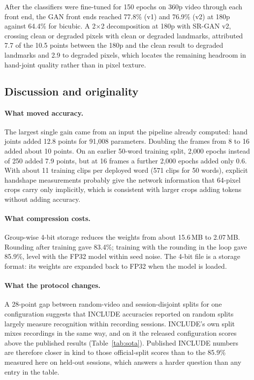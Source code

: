 \documentclass[pdflatex,sn-mathphys-num,twocolumn,lineno]{sn-jnl}
\theoremstyle{thmstyleone}%
\begin{document}
After the classifiers were fine-tuned for 150 epochs on 360p video through each front end, the GAN front ends reached 77.8\% (v1) and 76.9\% (v2) at 180p against 64.4\% for bicubic. A 2$\times$2 decomposition at 180p with SR-GAN v2, crossing clean or degraded pixels with clean or degraded landmarks, attributed 7.7 of the 10.5 points between the 180p and the clean result to degraded landmarks and 2.9 to degraded pixels, which locates the remaining headroom in hand-joint quality rather than in pixel texture.

\subsection{Discussion and originality}\label{sec:discussion}

\paragraph{What moved accuracy.} The largest single gain came from an input the pipeline already computed: hand joints added 12.8 points for 91,008 parameters. Doubling the frames from 8 to 16 added about 10 points. On an earlier 50-word training split, 2,000 epochs instead of 250 added 7.9 points, but at 16 frames a further 2,000 epochs added only 0.6. With about 11 training clips per deployed word (571 clips for 50 words), explicit handshape measurements probably give the network information that 64-pixel crops carry only implicitly, which is consistent with larger crops adding tokens without adding accuracy.

\paragraph{What compression costs.} Group-wise 4-bit storage reduces the weights from about 15.6\,MB to 2.07\,MB. Rounding after training gave 83.4\%; training with the rounding in the loop gave 85.9\%, level with the FP32 model within seed noise. The 4-bit file is a storage format: its weights are expanded back to FP32 when the model is loaded.

\paragraph{What the protocol changes.} A 28-point gap between random-video and session-disjoint splits for one configuration suggests that INCLUDE accuracies reported on random splits largely measure recognition within recording sessions. INCLUDE's own split mixes recordings in the same way, and on it the released configuration scores above the published results (Table~\ref{tab:sota}). Published INCLUDE numbers~\cite{sridhar2020include,selvaraj2022openhands,patra2024hwgat} are therefore closer in kind to those official-split scores than to the 85.9\% measured here on held-out sessions, which answers a harder question than any entry in the table.
\end{document}
